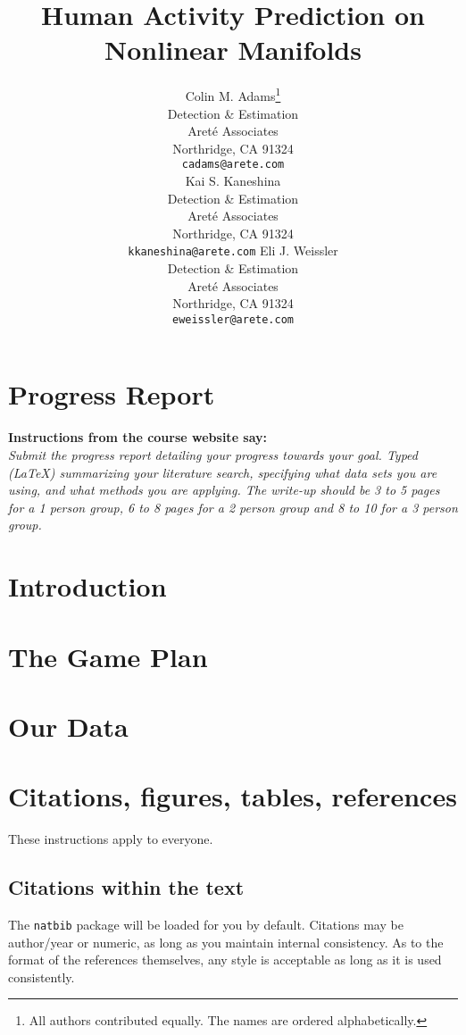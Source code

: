 \documentclass{article}
\title{Human Activity Prediction on Nonlinear Manifolds}
\author{
  Colin M. Adams\thanks{All authors contributed equally. The names are ordered alphabetically.} \\
   Detection \& Estimation\\
   Aret\'e Associates\\
   Northridge, CA 91324 \\
   \texttt{cadams@arete.com}

  \And
  Kai S. Kaneshina \\
   Detection \& Estimation\\
   Aret\'e Associates\\
   Northridge, CA 91324 \\
   \texttt{kkaneshina@arete.com} 
  \And
  Eli J. Weissler \\
   Detection \& Estimation\\
   Aret\'e Associates\\
   Northridge, CA 91324 \\
   \texttt{eweissler@arete.com}
}
\begin{document}

\maketitle

\begin{abstract}
  
\end{abstract}

\section{Progress Report}
\textbf{Instructions from the course website say:}\\
{\itshape Submit the progress report detailing your progress towards your goal. Typed (LaTeX) summarizing your literature search, specifying what data sets you are using, and what methods you are applying. The write-up should be 3 to 5 pages for a 1 person group, 6 to 8 pages for a 2 person group and 8 to 10 for a 3 person group. }


\section{Introduction}
  

\section{The Game Plan}
\label{sec:game_plan}
  

\section{Our Data}
\label{sec:data}
  


\section{Citations, figures, tables, references}
\label{others}

These instructions apply to everyone.

\subsection{Citations within the text}

The \verb+natbib+ package will be loaded for you by default.
Citations may be author/year or numeric, as long as you maintain
internal consistency.  As to the format of the references themselves,
any style is acceptable as long as it is used consistently.
\end{document}
